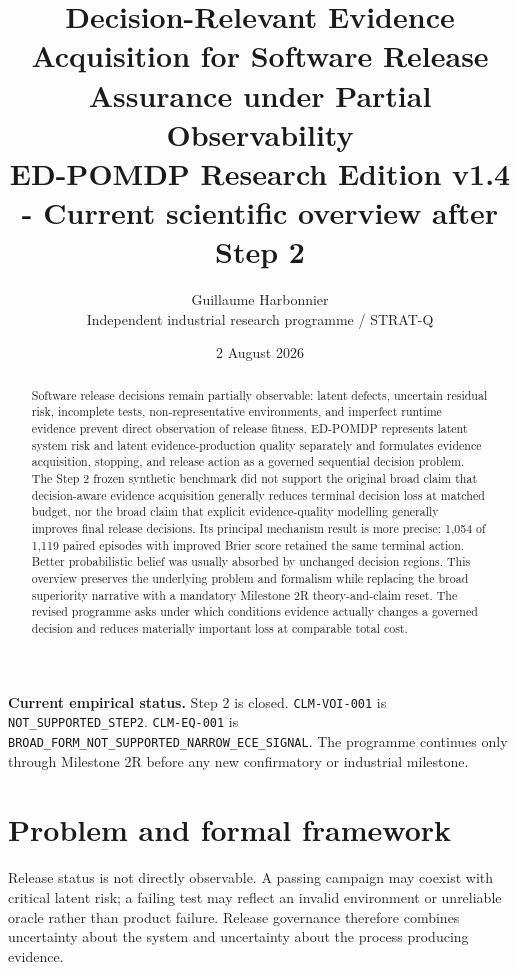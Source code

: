 \documentclass[11pt,a4paper]{article}
\title{\textbf{Decision-Relevant Evidence Acquisition for Software Release Assurance under Partial Observability}\\
\large ED-POMDP Research Edition v1.4 - Current scientific overview after Step 2}
\author{Guillaume Harbonnier\\Independent industrial research programme / STRAT-Q}
\date{2 August 2026}
\begin{document}
\maketitle

\begin{abstract}
Software release decisions remain partially observable: latent defects, uncertain residual risk, incomplete tests, non-representative environments, and imperfect runtime evidence prevent direct observation of release fitness. ED-POMDP represents latent system risk and latent evidence-production quality separately and formulates evidence acquisition, stopping, and release action as a governed sequential decision problem. The Step 2 frozen synthetic benchmark did not support the original broad claim that decision-aware evidence acquisition generally reduces terminal decision loss at matched budget, nor the broad claim that explicit evidence-quality modelling generally improves final release decisions. Its principal mechanism result is more precise: 1,054 of 1,119 paired episodes with improved Brier score retained the same terminal action. Better probabilistic belief was usually absorbed by unchanged decision regions. This overview preserves the underlying problem and formalism while replacing the broad superiority narrative with a mandatory Milestone 2R theory-and-claim reset. The revised programme asks under which conditions evidence actually changes a governed decision and reduces materially important loss at comparable total cost.
\end{abstract}

\begin{tcolorbox}[colback=softblue,colframe=deepblue,boxrule=0.8pt,arc=2mm]
\textbf{Current empirical status.} Step 2 is closed. \texttt{CLM-VOI-001} is \texttt{NOT\_SUPPORTED\_STEP2}. \texttt{CLM-EQ-001} is \texttt{BROAD\_FORM\_NOT\_SUPPORTED\_NARROW\_ECE\_SIGNAL}. The programme continues only through Milestone 2R before any new confirmatory or industrial milestone.
\end{tcolorbox}

\section{Problem and formal framework}

Release status is not directly observable. A passing campaign may coexist with critical latent risk; a failing test may reflect an invalid environment or unreliable oracle rather than product failure. Release governance therefore combines uncertainty about the system and uncertainty about the process producing evidence.
\end{document}
